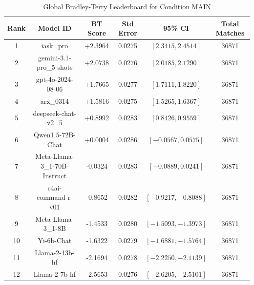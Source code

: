 \begin{table}[ht]
\centering
\caption{Global Bradley-Terry Leaderboard for Condition \textsc{MAIN}}
\label{tab:leaderboard_main}
\begin{tabular}{cccccc}
\hline
\textbf{Rank} & \textbf{Model ID} & \textbf{BT Score} & \textbf{Std Error} & \textbf{95\% CI} & \textbf{Total Matches} \\
\hline
1 & iask\_pro & +2.3964 & 0.0275 & $[2.3415, 2.4514]$ & 36871 \\
2 & gemini-3.1-pro\_5-shots & +2.0738 & 0.0276 & $[2.0185, 2.1290]$ & 36871 \\
3 & gpt-4o-2024-08-06 & +1.7665 & 0.0277 & $[1.7111, 1.8220]$ & 36871 \\
4 & arx\_0314 & +1.5816 & 0.0275 & $[1.5265, 1.6367]$ & 36871 \\
5 & deepseek-chat-v2\_5 & +0.8992 & 0.0283 & $[0.8426, 0.9559]$ & 36871 \\
6 & Qwen1.5-72B-Chat & +0.0004 & 0.0286 & $[-0.0567, 0.0575]$ & 36871 \\
7 & Meta-Llama-3\_1-70B-Instruct & -0.0324 & 0.0283 & $[-0.0889, 0.0241]$ & 36871 \\
8 & c4ai-command-r-v01 & -0.8652 & 0.0282 & $[-0.9217, -0.8088]$ & 36871 \\
9 & Meta-Llama-3\_1-8B & -1.4533 & 0.0280 & $[-1.5093, -1.3973]$ & 36871 \\
10 & Yi-6b-Chat & -1.6322 & 0.0279 & $[-1.6881, -1.5764]$ & 36871 \\
11 & Llama-2-13b-hf & -2.1694 & 0.0278 & $[-2.2250, -2.1139]$ & 36871 \\
12 & Llama-2-7b-hf & -2.5653 & 0.0276 & $[-2.6205, -2.5101]$ & 36871 \\
\hline
\end{tabular}
\end{table}
